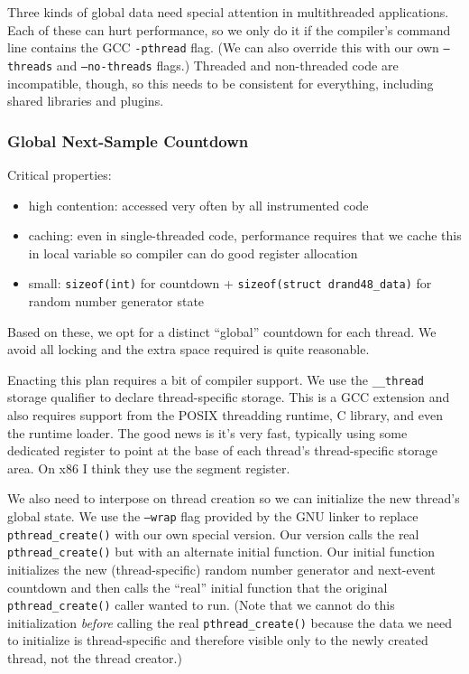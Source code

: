 \documentclass[10pt,twocolumn]{article}
\begin{document}
Three kinds of global data need special attention in multithreaded
applications.  Each of these can hurt performance, so we only do it if
the compiler's command line contains the GCC \texttt{-pthread} flag.
(We can also override this with our own \texttt{--threads} and
\texttt{--no-threads} flags.)  Threaded and non-threaded code are
incompatible, though, so this needs to be consistent for everything,
including shared libraries and plugins.

\subsubsection{Global Next-Sample Countdown}

Critical properties:

\begin{itemize}
\item high contention: accessed very often by all instrumented code
\item caching: even in single-threaded code, performance requires that
  we cache this in local variable so compiler can do good register
  allocation
\item small: \texttt{sizeof(int)} for countdown +
  \texttt{sizeof(struct drand48\_data)} for random number generator
  state
\end{itemize}

Based on these, we opt for a distinct ``global'' countdown for each
thread.  We avoid all locking and the extra space required is quite
reasonable.

Enacting this plan requires a bit of compiler support.  We use the
\texttt{\_\_thread} storage qualifier to declare thread-specific
storage.  This is a GCC extension and also requires support from the
POSIX threadding runtime, C library, and even the runtime loader.  The
good news is it's very fast, typically using some dedicated register
to point at the base of each thread's thread-specific storage area.
On x86 I think they use the segment register.

We also need to interpose on thread creation so we can initialize the
new thread's global state.  We use the \texttt{--wrap} flag provided
by the GNU linker to replace \texttt{pthread\_create()} with our own
special version.  Our version calls the real
\texttt{pthread\_create()} but with an alternate initial function.
Our initial function initializes the new (thread-specific) random
number generator and next-event countdown and then calls the ``real''
initial function that the original \texttt{pthread\_create()} caller
wanted to run.  (Note that we cannot do this initialization
\emph{before} calling the real \texttt{pthread\_create()} because the
data we need to initialize is thread-specific and therefore visible
only to the newly created thread, not the thread creator.)
\end{document}

